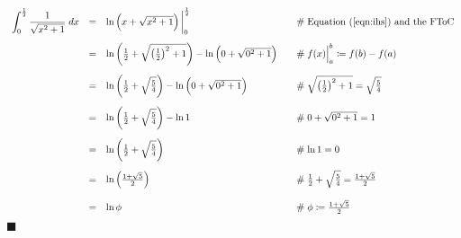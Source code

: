 \documentclass{article}
\theoremstyle{definition}
\begin{document}
\begin{equation*}
\begin{array}{llll} 
{\displaystyle \int_{0}^{\frac{1}{2}} \dfrac{1}{\sqrt{x^{2} + 1}} \;  dx} 
&=&	\ln \left (x + \sqrt{x^{2} + 1} \right ) \bigg |_{0}^{\frac{1}{2}}
		&\hspace{1em} \mathrel{\#} \text{Equation (\ref{eqn:ihs}) and the FToC} \\
[15pt]
&=& \ln \left ( \frac{1}{2} + \sqrt{\left (\frac{1}{2} \right )^{2} + 1} \right ) -
	\ln \left ( 0 + \sqrt{0^{2} + 1} \right )
		&\hspace{1em} \mathrel{\#} f(x) \Big |_{a}^{b} \coloneqq f(b) - f(a)\\
[15pt]
&=& \ln \left ( \frac{1}{2} + \sqrt{\frac{5}{4}} \right ) -
	\ln \left ( 0 + \sqrt{0^{2} + 1} \right )
		&\hspace{1em} \mathrel{\#} \sqrt{\left (\frac{1}{2} \right )^{2} + 1} = 
									\sqrt{\frac{5}{4}} \\
[15pt]
&=& \ln \left ( \frac{1}{2} + \sqrt{\frac{5}{4}} \right ) - \ln 1
		&\hspace{1em} \mathrel{\#} 0 + \sqrt{0^{2} + 1} = 1 \\
[15pt]
&=& \ln \left ( \frac{1}{2} + \sqrt{\frac{5}{4}} \right )
		&\hspace{1em} \mathrel{\#} \ln 1 = 0 \\
[15pt]
&=& \ln \left ( \frac{1 + \sqrt{5}}{2} \right )
		&\hspace{1em} \mathrel{\#} \frac{1}{2} + \sqrt{\frac{5}{4}} = 
									\frac{1 + \sqrt{5}}{2} \\
[15pt]
&=& \ln \phi
		&\hspace{1em} \mathrel{\#} \phi \coloneqq \frac{1 + \sqrt{5}}{2}
\end{array}
\end{equation*}
$\blacksquare$
%
%
\end{document}
